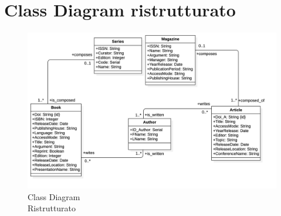     \section{Class Diagram ristrutturato}
  
    \begin{figure}[hbt]
	\centering
	\includegraphics[width=1.2\textwidth]{Immagini/ClassDiagramRIS.png}
	\caption{Class Diagram \\ Ristrutturato}
	\label{fig:ClassDiagramRIS}
	\end{figure}

